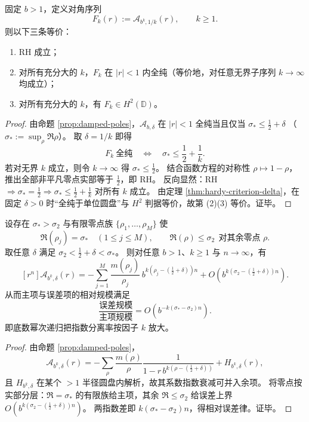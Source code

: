 \begin{theorem}\label{thm:abel-diagonal-renormalization-rh-criterion}
固定 \(b>1\)，定义对角序列
\[
F_k(r):=\mathcal A_{b^k,1/k}(r),\qquad k\ge 1.
\]
则以下三条等价：
\begin{enumerate}
  \item RH 成立；
  \item 对所有充分大的 \(k\)，\(F_k\) 在 \(|r|<1\) 内全纯（等价地，对任意无界子序列 \(k\to\infty\) 均成立）；
  \item 对所有充分大的 \(k\)，有 \(F_k\in H^2(\mathbb D)\)。
\end{enumerate}
\end{theorem}
\begin{proof}
由命题 \ref{prop:damped-poles}，\(\mathcal A_{b,\delta}\) 在 \(|r|<1\) 全纯当且仅当
\(
\sigma_*\le \frac12+\delta
\)
（\(\sigma_*:=\sup_\rho\Re\rho\)）。
取 \(\delta=1/k\) 即得
\[
F_k\ \text{全纯}\quad\Longleftrightarrow\quad \sigma_*\le \frac12+\frac1k.
\]
若对无界 \(k\) 成立，则令 \(k\to\infty\) 得 \(\sigma_*\le\frac12\)。
结合函数方程的对称性 \(\rho\mapsto 1-\rho\)，推出全部非平凡零点实部等于 \(\frac12\)，即 RH。
反向显然：RH \(\Rightarrow \sigma_*=\frac12\Rightarrow \sigma_*\le \frac12+\frac1k\) 对所有 \(k\) 成立。
由定理 \ref{thm:hardy-criterion-delta}，在固定 \(\delta>0\) 时“全纯于单位圆盘”与 \(H^2\) 判据等价，故第 (2)(3) 等价。证毕。
\end{proof}

\begin{theorem}[幂底数递归下的谱隙放大与误差指数分离]\label{thm:abel-power-base-gap-amplification}
设存在 \(\sigma_*>\sigma_2\) 与有限零点族 \(\{\rho_1,\dots,\rho_M\}\) 使
\[
\Re(\rho_j)=\sigma_*\quad(1\le j\le M),\qquad
\Re(\rho)\le \sigma_2\ \ \text{对其余零点 }\rho.
\]
取任意 \(\delta\) 满足
\(
\sigma_2<\frac12+\delta<\sigma_*
\)。
则对任意 \(b>1\)、\(k\ge 1\) 与 \(n\to\infty\)，有
\[
[r^n]\mathcal A_{b^k,\delta}(r)
=-\sum_{j=1}^M\frac{m(\rho_j)}{\rho_j}\,b^{k(\rho_j-(\frac12+\delta))n}
+O\!\left(b^{k(\sigma_2-(\frac12+\delta))n}\right).
\]
从而主项与误差项的相对规模满足
\[
\frac{\text{误差规模}}{\text{主项规模}}
=O\!\left(b^{-k(\sigma_*-\sigma_2)n}\right).
\]
即底数幂次递归把指数分离率按因子 \(k\) 放大。
\end{theorem}
\begin{proof}
由命题 \ref{prop:damped-poles}，
\[
\mathcal A_{b^k,\delta}(r)
=-\sum_\rho\frac{m(\rho)}{\rho}\frac1{1-r\,b^{k(\rho-(\frac12+\delta))}}
+H_{b^k,\delta}(r),
\]
且 \(H_{b^k,\delta}\) 在某个 \(>1\) 半径圆盘内解析，故其系数指数衰减可并入余项。
将零点按实部分层：\(\Re=\sigma_*\) 的有限族给主项，其余 \(\Re\le \sigma_2\) 给误差上界
\(
O(b^{k(\sigma_2-(\frac12+\delta))n})
\)。
两指数差即
\(
k(\sigma_*-\sigma_2)n
\)，得相对误差律。证毕。
\end{proof}





\endinput
